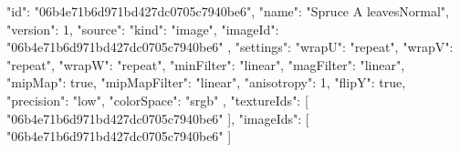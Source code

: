 {
  "id": "06b4e71b6d971bd427dc0705c7940be6",
  "name": "Spruce A leavesNormal",
  "version": 1,
  "source": {
    "kind": "image",
    "imageId": "06b4e71b6d971bd427dc0705c7940be6"
  },
  "settings": {
    "wrapU": "repeat",
    "wrapV": "repeat",
    "wrapW": "repeat",
    "minFilter": "linear",
    "magFilter": "linear",
    "mipMap": true,
    "mipMapFilter": "linear",
    "anisotropy": 1,
    "flipY": true,
    "precision": "low",
    "colorSpace": "srgb"
  },
  "textureIds": [
    "06b4e71b6d971bd427dc0705c7940be6"
  ],
  "imageIds": [
    "06b4e71b6d971bd427dc0705c7940be6"
  ]
}

